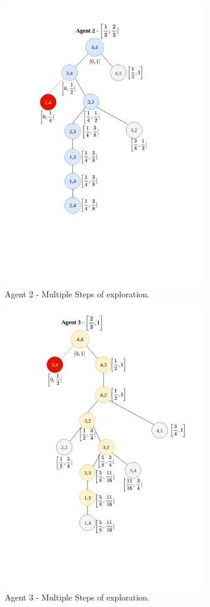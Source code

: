 \begin{figure}[H]
    \centering
    \includegraphics[width=0.8\textwidth]{ApeA/maze_agent_2_step_3.png}
    \caption{Agent 2 - Multiple Steps of exploration.}
    \label{fig_agent_2_step_3}
\end{figure}

\begin{figure}[H]
    \centering
    \includegraphics[width=0.8\textwidth]{ApeA/maze_agent_3_step_3.png}
    \caption{Agent 3 - Multiple Steps of exploration.}
    \label{fig_agent_3_step_3}
\end{figure}

